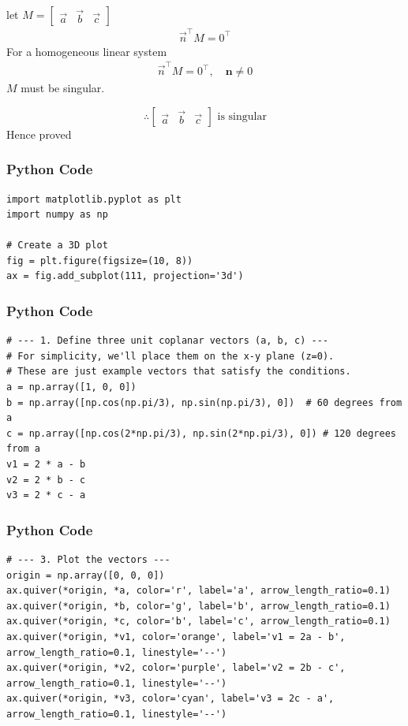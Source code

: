 \documentclass{beamer}
\begin{document}
\begin{frame}
let $M = \begin{bmatrix} \vec{a} & \vec{b} & \vec{c} \end{bmatrix}$
\begin{align}
\vec{n}^\top M = 0^\top
\end{align}
For a homogeneous linear system
\begin{align}
\vec{n}^\top M = 0^\top, \quad \mathbf{n} \neq 0
\end{align}
$M$ must be singular.

\[\therefore \begin{bmatrix} \vec{a} & \vec{b} & \vec{c}  \end{bmatrix} \text{ is singular}\]
Hence proved
\end{frame}


\begin{frame}[fragile]
    \frametitle{Python Code}
    \begin{lstlisting}
import matplotlib.pyplot as plt
import numpy as np

# Create a 3D plot
fig = plt.figure(figsize=(10, 8))
ax = fig.add_subplot(111, projection='3d')

\end{lstlisting}
\end{frame}

\begin{frame}[fragile]
    \frametitle{Python Code}
    \begin{lstlisting}
# --- 1. Define three unit coplanar vectors (a, b, c) ---
# For simplicity, we'll place them on the x-y plane (z=0).
# These are just example vectors that satisfy the conditions.
a = np.array([1, 0, 0])
b = np.array([np.cos(np.pi/3), np.sin(np.pi/3), 0])  # 60 degrees from a
c = np.array([np.cos(2*np.pi/3), np.sin(2*np.pi/3), 0]) # 120 degrees from a
v1 = 2 * a - b
v2 = 2 * b - c
v3 = 2 * c - a

    \end{lstlisting}
\end{frame}
\begin{frame}[fragile]
    \frametitle{Python Code}

    \begin{lstlisting}
# --- 3. Plot the vectors ---
origin = np.array([0, 0, 0])
ax.quiver(*origin, *a, color='r', label='a', arrow_length_ratio=0.1)
ax.quiver(*origin, *b, color='g', label='b', arrow_length_ratio=0.1)
ax.quiver(*origin, *c, color='b', label='c', arrow_length_ratio=0.1)
ax.quiver(*origin, *v1, color='orange', label='v1 = 2a - b', arrow_length_ratio=0.1, linestyle='--')
ax.quiver(*origin, *v2, color='purple', label='v2 = 2b - c', arrow_length_ratio=0.1, linestyle='--')
ax.quiver(*origin, *v3, color='cyan', label='v3 = 2c - a', arrow_length_ratio=0.1, linestyle='--')

    \end{lstlisting}
\end{frame}
\end{document}
